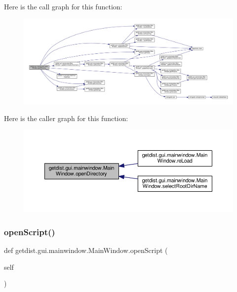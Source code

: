 Here is the call graph for this function\+:
\nopagebreak
\begin{figure}[H]
\begin{center}
\leavevmode
\includegraphics[width=350pt]{classgetdist_1_1gui_1_1mainwindow_1_1MainWindow_ab4eed3e548a98ed4b789a5cf9324027a_cgraph}
\end{center}
\end{figure}
Here is the caller graph for this function\+:
\nopagebreak
\begin{figure}[H]
\begin{center}
\leavevmode
\includegraphics[width=350pt]{classgetdist_1_1gui_1_1mainwindow_1_1MainWindow_ab4eed3e548a98ed4b789a5cf9324027a_icgraph}
\end{center}
\end{figure}
\mbox{\label{classgetdist_1_1gui_1_1mainwindow_1_1MainWindow_aa1199c47ac9d83249d622855f0d8dcb3}} 
\subsubsection{\texorpdfstring{open\+Script()}{openScript()}}
{\footnotesize\ttfamily def getdist.\+gui.\+mainwindow.\+Main\+Window.\+open\+Script (\begin{DoxyParamCaption}\item[{}]{self }\end{DoxyParamCaption})}



